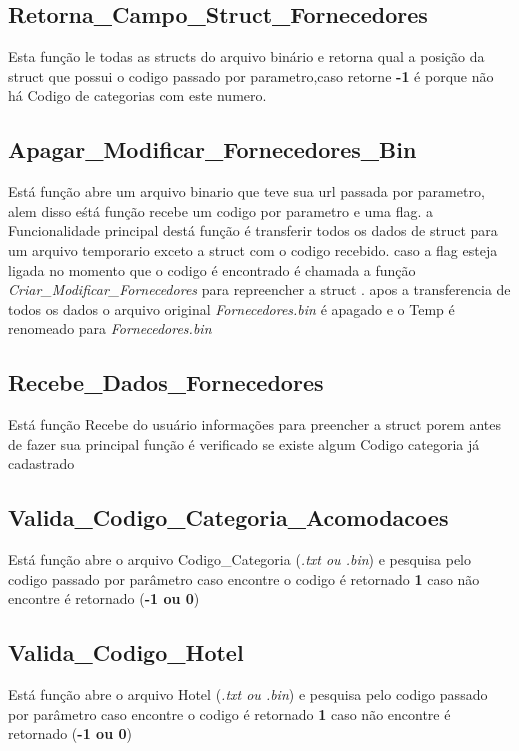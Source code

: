 \documentclass{article}
\begin{document}
\subsection{Retorna\_Campo\_Struct\_Fornecedores}
	Esta função le todas as structs do arquivo binário e retorna qual a posição da struct que possui o codigo passado por parametro,caso retorne \textbf{-1} é porque não há Codigo de categorias com este numero.

\subsection{Apagar\_Modificar\_Fornecedores\_Bin}
	Está função abre um arquivo binario que teve sua  url passada por parametro, alem disso eśtá função recebe um codigo por parametro e uma flag.
	a Funcionalidade principal destá função é transferir todos os dados de struct para um arquivo temporario exceto a struct com o codigo recebido. caso a flag esteja ligada no momento que o codigo é encontrado é chamada a função \textit{Criar\_Modificar\_Fornecedores} para repreencher a struct . apos a transferencia de todos os dados o arquivo original \textit{Fornecedores.bin} é apagado e o Temp é renomeado para \textit{Fornecedores.bin}

\subsection{Recebe\_Dados\_Fornecedores}	
	Está função Recebe do usuário informações para preencher a struct porem antes de fazer sua principal função é verificado se existe algum Codigo categoria já cadastrado
	
	
\subsection{Valida\_Codigo\_Categoria\_Acomodacoes}
	Está função  abre o arquivo Codigo\_Categoria (\textit{.txt ou .bin}) e pesquisa pelo codigo passado por parâmetro caso encontre o codigo é retornado \textbf{1} caso  não encontre é retornado (\textbf{-1 ou 0})
	
\subsection{Valida\_Codigo\_Hotel}
	Está função  abre o arquivo Hotel (\textit{.txt ou .bin}) e pesquisa pelo codigo passado por parâmetro caso encontre o codigo é retornado \textbf{1} caso  não encontre é retornado (\textbf{-1 ou 0})
\end{document}
